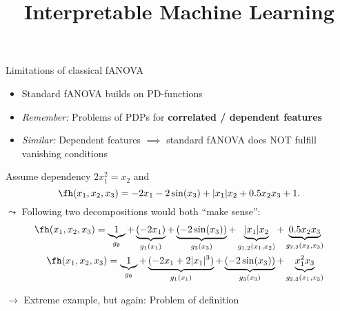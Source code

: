 \documentclass[11pt,compress,t,notes=noshow, aspectratio=169, xcolor=table]{beamer}
\title{Interpretable Machine Learning}
\date{}
\begin{document}
\newcommand{\titlefigure}{figure/open_blackbox}
\newcommand{\learninggoals}{
\item Limitations of classical fANOVA
\item Alternatives: generalized fANOVA and ALE
\item Advantages and Relevance of functional decompositions
}


\begin{frame}{Limitations of classical fANOVA}

    \begin{itemize}
    
        \item Standard fANOVA builds on PD-functions
        
        \item \textit{Remember:} Problems of PDPs for \textbf{correlated / dependent features}
        \item \textit{Similar:} Dependent features $\implies$ standard fANOVA does NOT fulfill vanishing conditions
    \end{itemize}
    \begin{example}
        Assume dependency \(2x_1^2 = x_2\) and
        \begin{equation*}
            \fh(x_1, x_2, x_3) = - 2x_1 - 2\sin(x_3) + |x_1|x_2 + 0.5 x_2 x_3 + 1.
        \end{equation*}
        $\leadsto$ Following two decompositions would both ``make sense'':
        \begin{align*}
            \fh(x_1, x_2, x_3)
            = \underbrace{1}_{g_\emptyset}
                + \underbrace{(- 2x_1)}_{g_1(x_1)} 
                + \underbrace{(- 2\sin(x_3))}_{g_3(x_3)}
                + \underbrace{|x_1|x_2}_{g_{1,2}(x_1, x_2)} 
                + \underbrace{0.5 x_2 x_3}_{g_{2,3}(x_2, x_3)} \\
            \fh(x_1, x_2, x_3)
            = \underbrace{1}_{g_\emptyset}
                + \underbrace{(- 2x_1 + 2 |x_1|^3)}_{g_1(x_1)} 
                + \underbrace{(- 2\sin(x_3))}_{g_3(x_3)}
                + \underbrace{x_1^2 x_3}_{g_{2,3}(x_1, x_3)}
        \end{align*}
    \end{example}
    $\rightarrow$ Extreme example, but again: Problem of definition


    
    
\end{frame}
\end{document}
